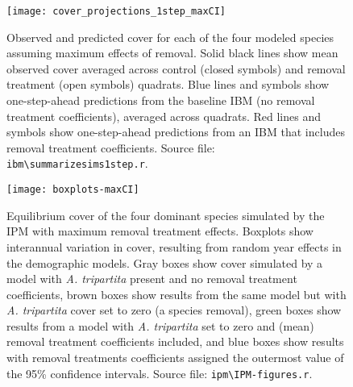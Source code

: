 \documentclass[11pt]{article}
\begin{document}
 \begin{figure}[tbp]
 \centering
 \texttt{[image: cover\_projections\_1step\_maxCI]}
 \caption{Observed and predicted cover for each of the four modeled species assuming maximum effects of removal. 
  Solid black lines show mean observed cover averaged across control (closed symbols) and removal treatment (open symbols) quadrats. Blue lines and symbols show one-step-ahead predictions from the baseline IBM (no removal treatment coefficients), averaged across quadrats. Red lines and symbols show one-step-ahead predictions from an IBM that includes removal treatment coefficients. 
  Source file: \texttt{ibm\textbackslash summarize\textunderscore sims1step.r}. }
 \label{fig:IBM1step-maxCI}
 \end{figure}
 
  \begin{figure}[tbp]
  \centering
  \texttt{[image: boxplots-maxCI]}
  \caption{Equilibrium cover of the four dominant species simulated by the IPM with maximum removal treatment effects. Boxplots show interannual variation in cover, 
  resulting from random year effects in the demographic models. Gray boxes show cover simulated by a model with \textit{A. tripartita} present and no removal treatment 
  coefficients, brown boxes show results from the same model but with \textit{A. tripartita} cover set to zero (a species removal), green boxes show results from a 
  model with  \textit{A. tripartita} set to zero and (mean) removal treatment coefficients included, and blue boxes show results with removal treatments 
  coefficients assigned the outermost value of the 95\% confidence intervals.  Source file: \texttt{ipm\textbackslash IPM-figures.r}.}
  \label{fig:IPMresults-maxCI}
  \end{figure}
\end{document}
